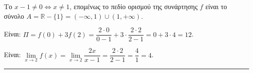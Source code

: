 \begin{alist}
\item Το $x-1 \neq 0 \Leftrightarrow x \neq 1$, επομένως το πεδίο ορισμού της συνάρτησης $f$ είναι το σύνολο $A = \mathbb{R} - \{1\} = (-\infty, 1) \cup (1, +\infty)$.
\item Είναι: $\Pi = f(0) + 3f(2) = \dfrac{2 \cdot 0}{0-1} + 3 \cdot \dfrac{2 \cdot 2}{2-1} = 0 + 3 \cdot 4 = 12$.
\item Είναι: $\lim\limits_{x \to 2} f(x) = \lim\limits_{x \to 2} \dfrac{2x}{x-1} = \dfrac{2 \cdot 2}{2-1} = \dfrac{4}{1} = 4$.
\end{alist}
\vspace{6mm}
\noindent\rule{\textwidth}{0.4pt}
\vspace{6mm}

